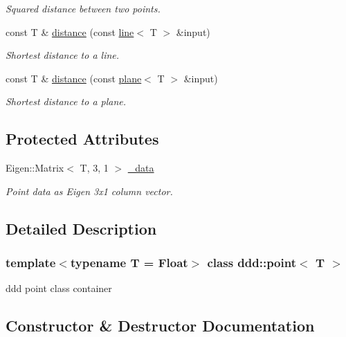 \begin{DoxyCompactItemize}
\begin{DoxyCompactList}\small\item\em Squared distance between two points. \end{DoxyCompactList}\item 
const T \& \hyperlink{classddd_1_1point_a8f6afdb0816e235ffd63a9d31a91e65f}{distance} (const \hyperlink{classddd_1_1line}{line}$<$ T $>$ \&input)
\begin{DoxyCompactList}\small\item\em Shortest distance to a line. \end{DoxyCompactList}\item 
const T \& \hyperlink{classddd_1_1point_a1080466b104b23a1b041f6049aaed15d}{distance} (const \hyperlink{classddd_1_1plane}{plane}$<$ T $>$ \&input)
\begin{DoxyCompactList}\small\item\em Shortest distance to a plane. \end{DoxyCompactList}\end{DoxyCompactItemize}
\subsection*{Protected Attributes}
\begin{DoxyCompactItemize}
\item 
\mbox{\label{classddd_1_1point_af4781a60e5c93aeaaab5c66add25b991}} 
Eigen\+::\+Matrix$<$ T, 3, 1 $>$ \hyperlink{classddd_1_1point_af4781a60e5c93aeaaab5c66add25b991}{\+\_\+data}
\begin{DoxyCompactList}\small\item\em Point data as Eigen 3x1 column vector. \end{DoxyCompactList}\end{DoxyCompactItemize}


\subsection{Detailed Description}
\subsubsection*{template$<$typename T = Float$>$\newline
class ddd\+::point$<$ T $>$}

ddd point class container 

\subsection{Constructor \& Destructor Documentation}
\mbox{\label{classddd_1_1point_a0146118d518509e9e7cdf4fb6733eb48}} 
